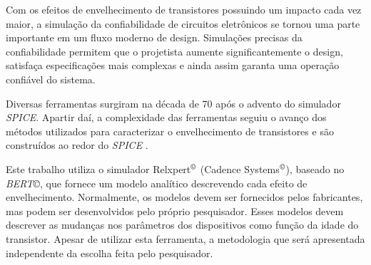 Com os efeitos de envelhecimento de transistores possuindo um impacto cada vez maior, a simulação da confiabilidade de circuitos eletrônicos se tornou uma parte importante em um fluxo moderno de design. Simulações precisas da confiabilidade permitem que o projetista aumente significantemente o design, satisfaça especificações mais complexas e ainda assim garanta uma operação confiável do sistema.

Diversas ferramentas surgiram na década de 70 após o advento do simulador \textit{SPICE}. Apartir daí, a complexidade das ferramentas seguiu o avanço dos métodos utilizados para caracterizar o envelhecimento de transistores e são construídos ao redor do \textit{SPICE} \cite{Maricau2013}.

Este trabalho utiliza o simulador Relxpert$^{\copyright}$ (Cadence Systems$^{\copyright}$), baseado no \textit{BERT\copyright}, que fornece um modelo analítico descrevendo cada efeito de envelhecimento. Normalmente, os modelos devem ser fornecidos pelos fabricantes, mas podem ser desenvolvidos pelo próprio pesquisador. Esses modelos devem descrever as mudanças nos parâmetros dos dispositivos como função da idade do transistor. Apesar de utilizar esta ferramenta, a metodologia que será apresentada independente da escolha feita pelo pesquisador.


